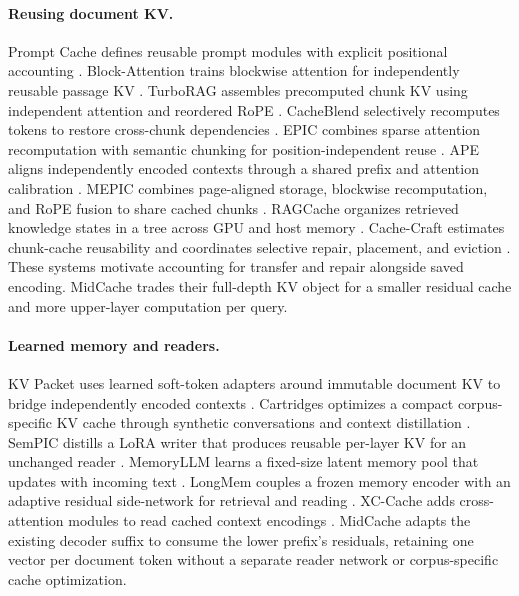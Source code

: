 \paragraph{Reusing document KV.}
Prompt Cache defines reusable prompt modules with explicit positional accounting \citep{promptcache}. Block-Attention trains blockwise attention for independently reusable passage KV \citep{blockattention}. TurboRAG assembles precomputed chunk KV using independent attention and reordered RoPE \citep{turborag}. CacheBlend selectively recomputes tokens to restore cross-chunk dependencies \citep{cacheblend}. EPIC combines sparse attention recomputation with semantic chunking for position-independent reuse \citep{epic}. APE aligns independently encoded contexts through a shared prefix and attention calibration \citep{ape}. MEPIC combines page-aligned storage, blockwise recomputation, and RoPE fusion to share cached chunks \citep{mepic}. RAGCache organizes retrieved knowledge states in a tree across GPU and host memory \citep{ragcache}. Cache-Craft estimates chunk-cache reusability and coordinates selective repair, placement, and eviction \citep{cachecraft}. These systems motivate accounting for transfer and repair alongside saved encoding. MidCache trades their full-depth KV object for a smaller residual cache and more upper-layer computation per query.

\paragraph{Learned memory and readers.}
KV Packet uses learned soft-token adapters around immutable document KV to bridge independently encoded contexts \citep{kvpacket}. Cartridges optimizes a compact corpus-specific KV cache through synthetic conversations and context distillation \citep{cartridges}. SemPIC distills a LoRA writer that produces reusable per-layer KV for an unchanged reader \citep{sempic}. MemoryLLM learns a fixed-size latent memory pool that updates with incoming text \citep{memoryllm}. LongMem couples a frozen memory encoder with an adaptive residual side-network for retrieval and reading \citep{longmem}. XC-Cache adds cross-attention modules to read cached context encodings \citep{xccache}. MidCache adapts the existing decoder suffix to consume the lower prefix's residuals, retaining one vector per document token without a separate reader network or corpus-specific cache optimization.

